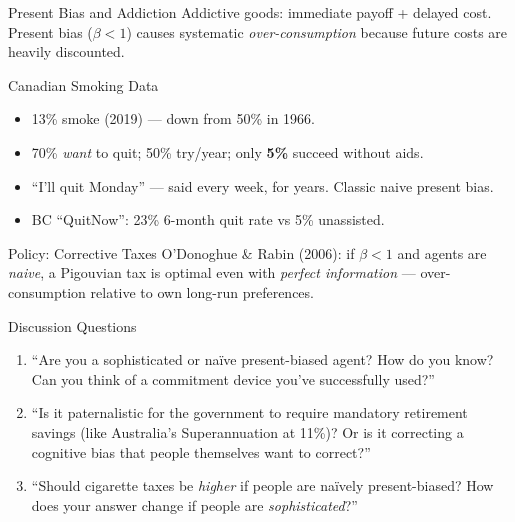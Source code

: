 \documentclass[aspectratio=169]{beamer}
\begin{document}
\begin{frame}{Present Bias and Addiction}
Addictive goods: immediate payoff + delayed cost. Present bias ($\beta < 1$) causes systematic \textit{over-consumption} because future costs are heavily discounted.
\begin{exampleblock}{Canadian Smoking Data}
\begin{itemize}\small
  \item 13\% smoke (2019) --- down from 50\% in 1966.
  \item 70\% \textit{want} to quit; 50\% try/year; only \textbf{5\%} succeed without aids.
  \item ``I'll quit Monday'' --- said every week, for years. Classic naive present bias.
  \item BC ``QuitNow'': 23\% 6-month quit rate vs 5\% unassisted.
\end{itemize}
\end{exampleblock}
\begin{alertblock}{Policy: Corrective Taxes}
O'Donoghue \& Rabin (2006): if $\beta < 1$ and agents are \textit{naive}, a Pigouvian tax is optimal even with \textit{perfect information} --- over-consumption relative to own long-run preferences.
\end{alertblock}
\end{frame}

\begin{frame}{Discussion Questions}
\begin{enumerate}
  \item[\textcolor{bepurple}{Q1.}] ``Are you a sophisticated or na\"{i}ve present-biased agent? How do you know? Can you think of a commitment device you've successfully used?''
  \medskip
  \item[\textcolor{beteal}{Q2.}] ``Is it paternalistic for the government to require mandatory retirement savings (like Australia's Superannuation at 11\%)? Or is it correcting a cognitive bias that people themselves want to correct?''
  \medskip
  \item[\textcolor{berust}{Q3.}] ``Should cigarette taxes be \textit{higher} if people are na\"{i}vely present-biased? How does your answer change if people are \textit{sophisticated}?''
\end{enumerate}
\end{frame}
\end{document}
